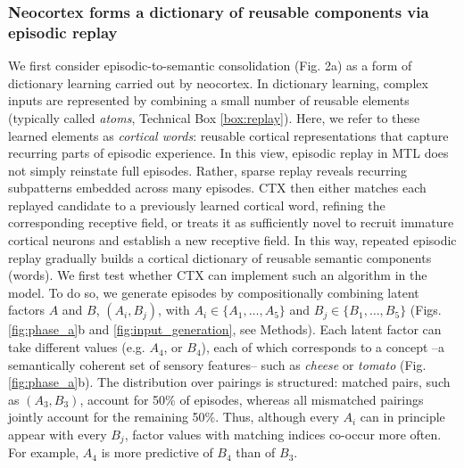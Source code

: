\documentclass{article}
\begin{document}
\subsubsection*{Neocortex forms a dictionary of reusable components via episodic replay}
We first consider episodic-to-semantic consolidation (Fig. 2a) as a form of dictionary learning carried out by neocortex. In dictionary learning, complex inputs are represented by combining a small number of reusable elements (typically called \textit{atoms}, Technical Box \ref{box:replay}). Here, we refer to these learned elements as \textit{cortical words}: reusable cortical representations that capture recurring parts of episodic experience. In this view, episodic replay in MTL does not simply reinstate full episodes. Rather, sparse replay reveals recurring subpatterns embedded across many episodes. CTX then either matches each replayed candidate to a previously learned cortical word, refining the corresponding receptive field, or treats it as sufficiently novel to recruit immature cortical neurons and establish a new receptive field. In this way, repeated episodic replay gradually builds a cortical dictionary of reusable semantic components (words).
\newline\newline
We first test whether CTX can implement such an algorithm in the model. To do so, we generate episodes by compositionally combining latent factors $A$ and $B$, $(A_i,B_j)$, with $A_i \in \{A_1,\dots,A_5\}$ and $B_j \in \{B_1,\dots,B_5\}$ (Figs. \ref{fig:phase_a}b and \ref{fig:input_generation}, see Methods). Each latent factor can take different values (e.g. $A_4$, or $B_4$), each of which corresponds to a concept --a semantically coherent set of sensory features-- such as \textit{cheese} or \textit{tomato} (Fig. \ref{fig:phase_a}b). The distribution over pairings is structured: matched pairs, such as $(A_3,B_3)$, account for 50\% of episodes, whereas all mismatched pairings jointly account for the remaining 50\%. Thus, although every $A_i$ can in principle appear with every $B_j$, factor values with matching indices co-occur more often. For example, $A_4$ is more predictive of $B_4$ than of $B_3$.
\newline\newline
\end{document}
